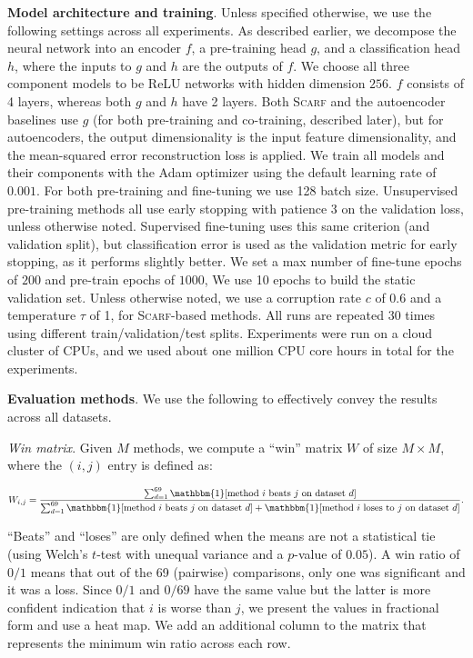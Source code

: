 {\bf Model architecture and training}. Unless specified otherwise, we use the following settings across all experiments. As described earlier, we decompose the neural network into an encoder $f$, a pre-training head $g$, and a classification head $h$, where the inputs to $g$ and $h$ are the outputs of $f$. We choose all three component models to be ReLU networks with hidden dimension $256$. $f$ consists of 4 layers, whereas both $g$ and $h$ have 2 layers. Both \textsc{Scarf} and the autoencoder baselines use $g$ (for both pre-training and co-training, described later), but for autoencoders, the output dimensionality is the input feature dimensionality, and the mean-squared error reconstruction loss is applied. We train all models and their components with the Adam optimizer using the default learning rate of $0.001$. For both pre-training and fine-tuning we use 128 batch size. Unsupervised pre-training methods all use early stopping with patience 3 on the validation loss, unless otherwise noted. Supervised fine-tuning uses this same criterion (and validation split), but classification error is used as the validation metric for early stopping, as it performs slightly better. We set a max number of fine-tune epochs of $200$ and pre-train epochs of $1000$, We use 10 epochs to build the static validation set. Unless otherwise noted, we use a corruption rate $c$ of 0.6 and a temperature $\tau$ of 1, for \textsc{Scarf}-based methods. All runs are repeated 30 times using different train/validation/test splits. Experiments were run on a cloud cluster of CPUs, and we used about one million CPU core hours in total for the experiments.

{\bf Evaluation methods}. We use the following to effectively convey the results across all datasets.

\emph{Win matrix}. Given $M$ methods, we compute a ``win'' matrix $W$ of size $M \times M$, where the $(i,j)$ entry is defined as:

\begin{align*}
    W_{i,j} = \frac{\sum_{d=1}^{69} \mathbbm{1}[\text{method } i \text{ beats } j \text{ on dataset } d]}{\sum_{d=1}^{69}  \mathbbm{1}[\text{method } i \text{ beats } j \text{ on dataset } d] + \mathbbm{1}[\text{method } i \text{ loses to } j \text{ on dataset } d]}.
\end{align*}

 ``Beats'' and ``loses'' are only defined when the means are not a statistical tie (using Welch's $t$-test with unequal variance and a $p$-value of $0.05$). A win ratio of $0/1$ means that out of the 69 (pairwise) comparisons, only one was significant and it was a loss. Since $0/1$ and $0/69$ have the same value but the latter is more confident indication that $i$ is worse than $j$, we present the values in fractional form and use a heat map. We add an additional column to the matrix that represents the minimum win ratio across each row.

